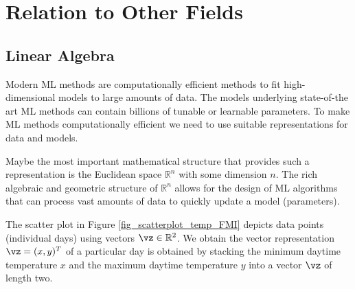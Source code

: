 \documentclass[12pt]{report}
\begin{document}
%
%
%
%
%
%


\section{Relation to Other Fields}

\subsection{Linear Algebra} 

Modern ML methods are computationally efficient methods to fit high-dimensional 
models to large amounts of data. The models underlying state-of-the art 
ML methods can contain billions of tunable or learnable parameters. To 
make ML methods computationally efficient we need to use suitable representations 
for data and models. 

Maybe the most important mathematical structure that provides such a 
representation is the Euclidean space $\mathbb{R}^{n}$ with some dimension 
$n$. The rich algebraic and geometric structure of $\mathbb{R}^{n}$ allows 
for the design of ML algorithms that can process vast amounts of data to 
quickly update a model (parameters). 

The scatter plot in Figure \ref{fig_scatterplot_temp_FMI} depicts 
data points (individual days) using vectors $\vz \in \mathbb{R}^{2}$. 
We obtain the vector representation $\vz=(x,y)^{T}$ of a particular 
day is obtained by stacking the minimum daytime temperature $x$ 
and the maximum daytime temperature $y$ into a vector $\vz$ of 
length two. 
\end{document}
